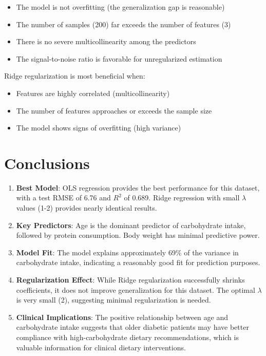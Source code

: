 \documentclass{article}
\begin{document}
\begin{itemize}
    \item The model is not overfitting (the generalization gap is reasonable)
    \item The number of samples (200) far exceeds the number of features (3)
    \item There is no severe multicollinearity among the predictors
    \item The signal-to-noise ratio is favorable for unregularized estimation
\end{itemize}

Ridge regularization is most beneficial when:
\begin{itemize}
    \item Features are highly correlated (multicollinearity)
    \item The number of features approaches or exceeds the sample size
    \item The model shows signs of overfitting (high variance)
\end{itemize}

\section{Conclusions}

\begin{enumerate}
    \item \textbf{Best Model}: OLS regression provides the best performance for this dataset, with a test RMSE of 6.76 and $R^2$ of 0.689. Ridge regression with small $\lambda$ values (1-2) provides nearly identical results.
    
    \item \textbf{Key Predictors}: Age is the dominant predictor of carbohydrate intake, followed by protein consumption. Body weight has minimal predictive power.
    
    \item \textbf{Model Fit}: The model explains approximately 69\% of the variance in carbohydrate intake, indicating a reasonably good fit for prediction purposes.
    
    \item \textbf{Regularization Effect}: While Ridge regularization successfully shrinks coefficients, it does not improve generalization for this dataset. The optimal $\lambda$ is very small (2), suggesting minimal regularization is needed.
    
    \item \textbf{Clinical Implications}: The positive relationship between age and carbohydrate intake suggests that older diabetic patients may have better compliance with high-carbohydrate dietary recommendations, which is valuable information for clinical dietary interventions.
\end{enumerate}
\end{document}
